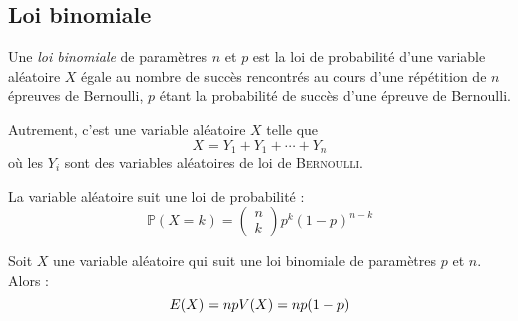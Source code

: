 \documentclass[11pt,a4paper,fleqn,pdftex]{report}
\begin{document}
\subsection{Loi binomiale} %
\label{sub:loi_binomiale}
\begin{dfn}
     Une \emph{loi binomiale} de paramètres $n$ et $p$ est la loi de probabilité d'une variable aléatoire $X$ égale au nombre de succès rencontrés au cours d'une répétition de $n$ épreuves de Bernoulli, $p$ étant la probabilité de succès d'une épreuve de Bernoulli.\par
     Autrement, c'est une variable aléatoire $X$ telle que 
     \[
         X = Y_1 + Y_1 + \cdots + Y_n
     \]
     où les $Y_i$ sont des variables aléatoires  de loi de \textsc{Bernoulli}.\par
     La variable aléatoire suit une loi de probabilité : 
     \begin{equation}
     \mathbb{P}(X = k) = \begin{pmatrix} n \\ k \end{pmatrix} p^k(1-p)^{n-k}
     \end{equation}
\end{dfn}
\begin{theorem}
     Soit $X$ une variable aléatoire qui suit une loi binomiale de paramètres $p$ et $n$. Alors :
     \begin{equation}
     E(X) = np \\ V(X) = np(1-p)
     \end{equation}
\end{theorem}
\end{document}
